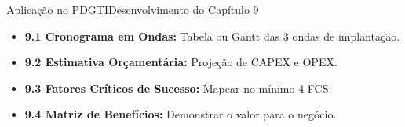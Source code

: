 \begin{senaiframe}{Aplicação no PDGTI}{Desenvolvimento do Capítulo 9}
  \vspace{0.5cm}
  \begin{tcolorbox}[senaigreencard, title={Capítulo 9 – Roadmap de Implantação \& Benefícios}]
    \begin{itemize}
      \item \textbf{9.1 Cronograma em Ondas:} Tabela ou Gantt das 3 ondas de implantação.
      \item \textbf{9.2 Estimativa Orçamentária:} Projeção de CAPEX e OPEX.
      \item \textbf{9.3 Fatores Críticos de Sucesso:} Mapear no mínimo 4 FCS.
      \item \textbf{9.4 Matriz de Benefícios:} Demonstrar o valor para o negócio.
    \end{itemize}
  \end{tcolorbox}
\end{senaiframe}
